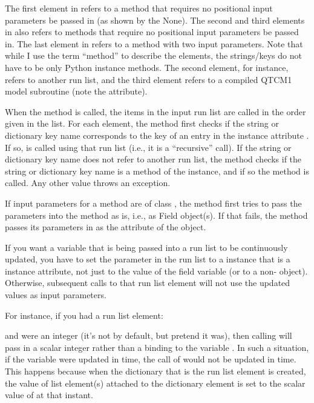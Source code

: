 The first element in  refers to a method that requires
no positional input parameters be passed in (as shown by the None).
The second and third elements in  also refers to methods
that require no positional input parameters be passed in.  The last
element in  refers to a method with two input parameters.
Note that while I use the term ``method'' to describe the elements,
the strings/keys do not have to be only Python instance methods.
The second element, for instance, refers to another run list, and
the third element refers to a compiled QTCM1 model subroutine (note
the  attribute).

When the  method is called, the items in the input
run list are called in the order given in the list.  For each
element,  the  method first checks if the string
or dictionary key name corresponds to the key of an entry in the
 instance attribute .  If so, 
is called using that run list (i.e., it is a ``recursive'' call).
If the string or dictionary key name does not refer to another run
list, the  method checks if the string or dictionary
key name is a method of the  instance, and if so the
method is called.  Any other value throws an exception.

If input parameters for a method are of class , the
 method first tries to pass the parameters into the
method as is, i.e., as Field object(s).  If that fails, the
 method  passes its parameters in as the 
attribute of the  object.

If you want a variable that is being passed into a run list to be
continuously updated, you have to set the parameter in the run list
to a  instance that is a  instance attribute,
not just to the value of the field variable (or to a non-
object).  Otherwise, subsequent calls to that run list element will
not use the updated values as input parameters.

For instance, if you had a run list element:
\begin{codeblock}
\end{codeblock}
and  were an integer (it's not by default,
but pretend it was), then  calling
 will pass in a scalar integer rather
than a binding to the variable .  In such
a situation, if the variable  were updated
in time, the  call of 
would not be updated in time.  This happens because when the
dictionary that is the run list element is created, the value of
list element(s) attached to the dictionary element is set to the
scalar value of  at that instant.

